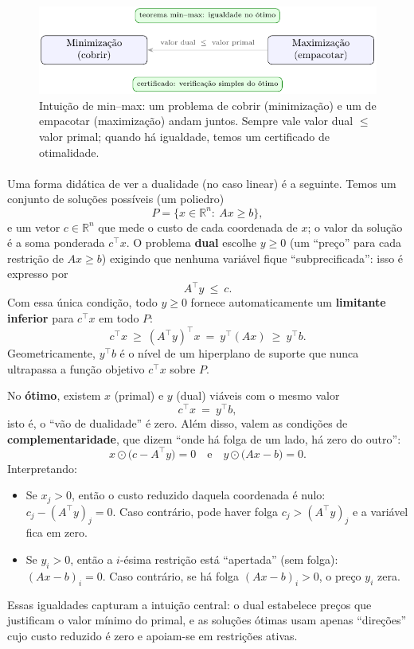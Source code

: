 \documentclass[12pt,a4paper]{article}
\def\emph#1{#1}%
\begin{document}
\begin{figure}[H]
    \centering
    \includegraphics[width=0.9\linewidth]{figures/fig_min_max_cert.pdf}

    \caption{Intuição de min--max: um problema de cobrir (minimização) e um de empacotar (maximização) andam juntos. Sempre vale valor dual $\le$ valor primal; quando há igualdade, temos um certificado de otimalidade.}
    \label{fig:min-max-cert}\end{figure}

\paragraph{}
Uma forma didática de ver a dualidade (no caso linear) é a seguinte. Temos um conjunto de soluções possíveis (um poliedro)
\[P=\{x\in\mathbb{R}^n:\ Ax\ge b\},\]
e um vetor \(c\in\mathbb{R}^n\) que mede o \emph{custo} de cada coordenada de \(x\); o valor da solução é a soma ponderada \(c^\top x\). O problema \textbf{dual} escolhe \(y\ge 0\) (um “preço” para cada restrição de \(Ax\ge b\)) exigindo que nenhuma variável fique “subprecificada”: isso é expresso por
\[A^\top y\ \le\ c.\]
Com essa única condição, todo \(y\ge 0\) fornece automaticamente um \textbf{limitante inferior} para \(c^\top x\) em todo \(P\):
\[c^\top x\ \ge\ (A^\top y)^\top x\ =\ y^\top(Ax)\ \ge\ y^\top b.\]
Geometricamente, \(y^\top b\) é o nível de um \emph{hiperplano de suporte} que nunca ultrapassa a função objetivo \(c^\top x\) sobre \(P\).

No \textbf{ótimo}, existem \(x\) (primal) e \(y\) (dual) viáveis com o \emph{mesmo} valor
\[c^\top x\ =\ y^\top b,\]
isto é, o “vão de dualidade” é zero. Além disso, valem as condições de \textbf{complementaridade}, que dizem “onde há folga de um lado, há zero do outro”:
\[x\odot\big(c-A^\top y\big)=0\quad\text{e}\quad y\odot\big(Ax-b\big)=0.
\]
Interpretando:
\begin{itemize}
    \item Se \(x_j>0\), então o \emph{custo reduzido} daquela coordenada é nulo: \(c_j-(A^\top y)_j=0\). Caso contrário, pode haver folga \(c_j>(A^\top y)_j\) e a variável fica em zero.
    \item Se \(y_i>0\), então a \(i\)-ésima restrição está “apertada” (sem folga): \((Ax-b)_i=0\). Caso contrário, se há folga \((Ax-b)_i>0\), o preço \(y_i\) zera.
\end{itemize}
Essas igualdades capturam a intuição central: o dual estabelece preços que justificam o valor mínimo do primal, e as soluções ótimas usam apenas “direções” cujo custo reduzido é zero e apoiam-se em restrições ativas.
\end{document}
